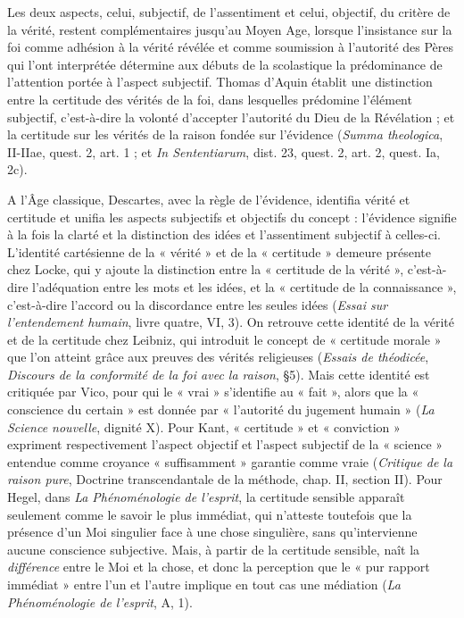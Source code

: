 Les deux aspects, celui, subjectif, de
l'assentiment et celui, objectif, du critère
de la vérité, restent complémentaires jusqu’au
Moyen Age, lorsque l’insistance sur
la foi comme adhésion à la vérité révélée
et comme soumission à l'autorité des
Pères qui l’ont interprétée détermine aux
débuts de la scolastique la prédominance
de l'attention portée à l’aspect subjectif.
Thomas d'Aquin établit une distinction
entre la certitude des vérités de la foi,
dans lesquelles prédomine l’élément subjectif,
c’est-à-dire la volonté d’accepter
l’autorité du Dieu de la Révélation ; et la
certitude sur les vérités de la raison fondée
sur l’évidence ({\it Summa theologica}, 
II-IIae, quest. 2, art. 1 ; et {\it In Sententiarum},
dist. 23, quest. 2, art. 2, quest. Ia, 2c).

A l’Âge classique, Descartes, avec la
règle de l’évidence, identifia vérité et certitude
et unifia les aspects subjectifs et
objectifs du concept : l’évidence signifie à
la fois la clarté et la distinction des idées
et l’assentiment subjectif à celles-ci.
L'identité cartésienne de la « vérité » et
de la « certitude » demeure présente chez
Locke, qui y ajoute la distinction entre la
« certitude de la vérité », c’est-à-dire
l’adéquation entre les mots et les idées, et
la « certitude de la connaissance », c’est-à-dire
l’accord ou la discordance entre les
seules idées ({\it Essai sur l’entendement
humain}, livre quatre, VI, 3). On retrouve
cette identité de la vérité et de la certitude
chez Leibniz, qui introduit le concept de
« certitude morale » que l’on atteint grâce
aux preuves des vérités religieuses ({\it Essais
de théodicée}, {\it Discours de la conformité de
la foi avec la raison}, \S 5). Mais cette identité
est critiquée par Vico, pour qui le
« vrai » s’identifie au « fait », alors que la
« conscience du certain » est donnée par
« l'autorité du jugement humain » ({\it La
Science nouvelle}, dignité X). Pour Kant,
« certitude » et « conviction » expriment
respectivement l’aspect objectif et l’aspect
subjectif de la « science » entendue
comme croyance « suffisamment » garantie
comme vraie ({\it Critique de la raison
%
pure}, Doctrine transcendantale de la
méthode, chap. II, section II). Pour
Hegel, dans {\it La Phénoménologie de l’esprit},
la certitude sensible apparaît seulement
comme le savoir le plus immédiat,
qui n’atteste toutefois que la présence
d’un Moi singulier face à une chose singulière,
sans qu’intervienne aucune
conscience subjective. Mais, à partir de la
certitude sensible, naît la {\it différence} entre
le Moi et la chose, et donc la perception
que le « pur rapport immédiat » entre l’un
et l’autre implique en tout cas une médiation
({\it La Phénoménologie de l'esprit}, A, 1).

